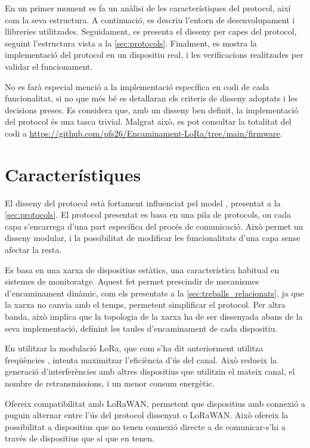 \documentclass{tfgitic}[2024/07/01]
\begin{document}
En un primer moment es fa un anàlisi de les característiques del protocol, així com la seva estructura. A continuació, es descriu l'entorn de desenvolupament i llibreries utilitzades. Seguidament, es presenta el disseny per capes del protocol, seguint l'estructura vista a la \autoref{sec:protocols}. Finalment, es mostra la implementació del protocol en un dispositiu real, i les verificacions realitzades per validar el funcionament.

No es farà especial menció a la implementació específica en codi de cada funcionalitat, si no que més bé es detallaran els criteris de disseny adoptats i les decisions preses. Es considera que, amb un disseny ben definit, la implementació del protocol és una tasca trivial. Malgrat això, es pot consultar la totalitat del codi a \url{https://github.com/pfs26/Encaminament-LoRa/tree/main/firmware}.

\section{Característiques}
El disseny del protocol està fortament influenciat pel model , presentat a la \autoref{sec:protocols}. El protocol presentat es basa en una pila de protocols, on cada capa s'encarrega d'una part específica del procés de comunicació. Això permet un disseny modular, i la possibilitat de modificar les funcionalitats d'una capa sense afectar la resta.

Es basa en una xarxa de dispositius estàtics, una característica habitual en sistemes de monitoratge. Aquest fet permet prescindir de mecanismes d'encaminament dinàmic, com els presentats a la \autoref{sec:treballs_relacionats}, ja que la xarxa no canvia amb el temps, permetent simplificar el protocol. Per altra banda, això implica que la topologia de la xarxa ha de ser dissenyada abans de la seva implementació, definint les taules d'encaminament de cada dispositiu.

En utilitzar la modulació LoRa, que com s'ha dit anteriorment utilitza freqüències , intenta maximitzar l'eficiència d'ús del canal. Això redueix la generació d'interferències amb altres dispositius que utilitzin el mateix canal, el nombre de retransmissions, i un menor consum energètic.

Ofereix compatibilitat amb LoRaWAN, permetent que dispositius amb connexió a  puguin alternar entre l'ús del protocol dissenyat o LoRaWAN. Això ofereix la possibilitat a dispositius que no tenen connexió directe a  de comunicar-s'hi a través de dispositius que sí que en tenen. 
\end{document}
